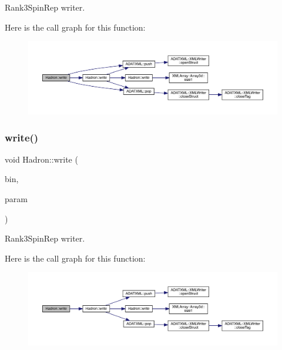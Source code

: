 Rank3\+Spin\+Rep writer. 

Here is the call graph for this function\+:
\nopagebreak
\begin{figure}[H]
\begin{center}
\leavevmode
\includegraphics[width=350pt]{d1/daf/namespaceHadron_a4286761aeb6d750c12bfba02d54b2b12_cgraph}
\end{center}
\end{figure}
\mbox{\label{namespaceHadron_ae2b761452803d14604c4471a4cf35ca3}} 
\subsubsection{\texorpdfstring{write()}{write()}\hspace{0.1cm}{\footnotesize\ttfamily [86/95]}}
{\footnotesize\ttfamily void Hadron\+::write (\begin{DoxyParamCaption}\item[{\mbox{\hyperlink{classADATIO_1_1BinaryWriter}{Binary\+Writer}} \&}]{bin,  }\item[{const \mbox{\hyperlink{structHadron_1_1Rank3SpinRep__t}{Rank3\+Spin\+Rep\+\_\+t}} \&}]{param }\end{DoxyParamCaption})}



Rank3\+Spin\+Rep writer. 

Here is the call graph for this function\+:
\nopagebreak
\begin{figure}[H]
\begin{center}
\leavevmode
\includegraphics[width=350pt]{d1/daf/namespaceHadron_ae2b761452803d14604c4471a4cf35ca3_cgraph}
\end{center}
\end{figure}
\mbox{\label{namespaceHadron_a2e0c9a892aa8790addf90c28db1eaf28}} 
